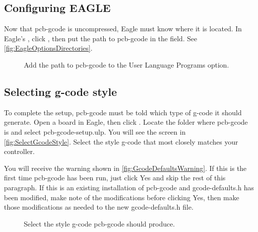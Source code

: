 \documentclass[11pt]{book}
\begin{document}
\subsection{Configuring EAGLE}
Now that pcb-gcode is uncompressed, Eagle must know where it is located. In Eagle's , click , then put the path to pcb-gcode in the  field. See \figurename \vref{fig:EagleOptionsDirectories}.

\begin{figure}
	\caption{Add the path to pcb-gcode to the User Language Programs option.}
	\label{fig:EagleOptionsDirectories}
\end{figure}

\subsection{Selecting g-code style}\label{sub:SelectingGCodeStyle}
To complete the setup, pcb-gcode must be told which type of g-code it should generate. Open a board in Eagle, then click . Locate the folder where pcb-gcode is and select pcb-gcode-setup.ulp. You will see the screen in \figurename \vref{fig:SelectGcodeStyle}. Select the style g-code that most closely matches your controller.

You will receive the warning shown in \figurename \vref{fig:GcodeDefaultsWarning}. If this is the first time pcb-gcode has been run, just click Yes and skip the rest of this paragraph. If this is an existing installation of pcb-gcode and gcode-defaults.h has been modified, make note of the modifications before clicking Yes, then make those modifications as needed to the new gcode-defaults.h file.

\begin{figure}
	\caption{Select the style g-code pcb-gcode should produce.}
	\label{fig:SelectGcodeStyle}
\end{figure}
\end{document}
